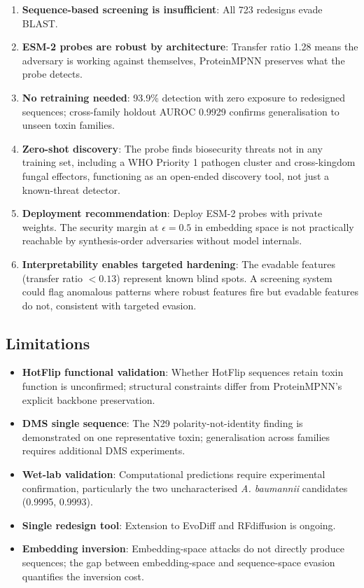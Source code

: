 \documentclass[11pt,a4paper]{article}
\begin{document}
\begin{enumerate}
    \item \textbf{Sequence-based screening is insufficient}: All 723 redesigns evade BLAST.
    \item \textbf{ESM-2 probes are robust by architecture}: Transfer ratio 1.28 means the adversary is working against themselves, ProteinMPNN preserves what the probe detects.
    \item \textbf{No retraining needed}: 93.9\% detection with zero exposure to redesigned sequences; cross-family holdout AUROC 0.9929 confirms generalisation to unseen toxin families.
    \item \textbf{Zero-shot discovery}: The probe finds biosecurity threats not in any training set, including a WHO Priority 1 pathogen cluster and cross-kingdom fungal effectors, functioning as an open-ended discovery tool, not just a known-threat detector.
    \item \textbf{Deployment recommendation}: Deploy ESM-2 probes with private weights. The security margin at $\epsilon = 0.5$ in embedding space is not practically reachable by synthesis-order adversaries without model internals.
    \item \textbf{Interpretability enables targeted hardening}: The evadable features (transfer ratio ${<}0.13$) represent known blind spots. A screening system could flag anomalous patterns where robust features fire but evadable features do not, consistent with targeted evasion.
\end{enumerate}

\subsection{Limitations}

\begin{itemize}
    \item \textbf{HotFlip functional validation}: Whether HotFlip sequences retain toxin function is unconfirmed; structural constraints differ from ProteinMPNN's explicit backbone preservation.
    \item \textbf{DMS single sequence}: The N29 polarity-not-identity finding is demonstrated on one representative toxin; generalisation across families requires additional DMS experiments.
    \item \textbf{Wet-lab validation}: Computational predictions require experimental confirmation, particularly the two uncharacterised \textit{A. baumannii} candidates (0.9995, 0.9993).
    \item \textbf{Single redesign tool}: Extension to EvoDiff and RFdiffusion is ongoing.
    \item \textbf{Embedding inversion}: Embedding-space attacks do not directly produce sequences; the gap between embedding-space and sequence-space evasion quantifies the inversion cost.
\end{itemize}
\end{document}
